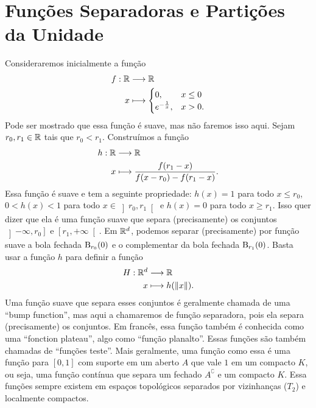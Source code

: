 \cleardoublepage





\section{Funções Separadoras e Partições da Unidade}

Consideraremos inicialmente a função
	\begin{align*}
	{f}: {\mathbb{R}} &\longrightarrow {\mathbb{R}} \\{x} &\longmapsto {\begin{cases}
		0,& x \leq 0 \\
		e^{-\frac{1}{x}},& x > 0.
	\end{cases}}
	\end{align*}
Pode ser mostrado que essa função é suave, mas não faremos isso aqui. Sejam $r_0,r_1 \in \mathbb{R}$ tais que $r_0 < r_1$. Construímos a função
	\begin{align*}
	{h}: {\mathbb{R}} &\longrightarrow {\mathbb{R}} \\{x} &\longmapsto {\frac{f(r_1-x)}{f(x-r_0)-f(r_1-x)}}.
	\end{align*}
Essa função é suave e tem a seguinte propriedade: $h(x)=1$ para todo $x \leq r_0$, $0 < h(x) < 1$ para todo $x \in \left ]r_0, r_1\right [$ e $h(x)=0$ para todo $x \geq r_1$. Isso quer dizer que ela é uma função suave que separa (precisamente) os conjuntos $\left ]-\infty,r_0\right ]$ e $\left [r_1,+\infty\right [$. Em $\mathbb{R}^d$, podemos separar (precisamente) por função suave a bola fechada $\mathrm{B}_{r_0}(0)$ e o complementar da bola fechada $\mathrm{B}_{r_1}(0)$. Basta usar a função $h$ para definir a função%
	\begin{align*}
	{H}: {\mathbb{R}^d} &\longrightarrow {\mathbb{R}} \\{x} &\longmapsto {h(\left\Vert{x}\right\Vert)}.
	\end{align*}
Uma função suave que separa esses conjuntos é geralmente chamada de uma ``bump function'', mas aqui a chamaremos de função separadora, pois ela separa (precisamente) os conjuntos. Em francês, essa função também é conhecida como uma ``fonction plateau'', algo como ``função planalto''. Essas funções são também chamadas de ``funções teste''.
Mais geralmente, uma função como essa é uma função para $[0,1]$ com suporte em um aberto $A$ que vale $1$ em um compacto $K$, ou seja, uma função contínua que separa um fechado $A^\complement$ e um compacto $K$. Essa funções sempre existem em espaços topológicos separados por vizinhanças ($T_2$) e localmente compactos.

